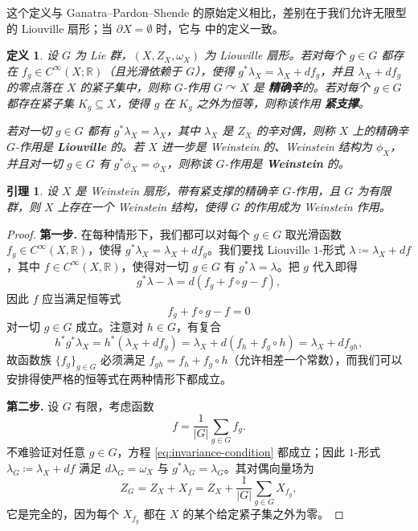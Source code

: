 \documentclass[11pt,a4paper]{article}
\renewcommand{\emph}[1]{{\bfseries #1}}
\theoremstyle{cnth}
\newtheorem{dfn}[thm]{定义}
\newtheorem{lmm}[thm]{引理}
\begin{document}
这个定义与 Ganatra--Pardon--Shende \cite{GPS20} 的原始定义相比，差别在于我们允许无限型的 Liouville 扇形；当 $\partial X=\emptyset$ 时，它与 \cite{CE12} 中的定义一致。

\begin{dfn}\label{defn:G-invariant-Weinstein-sector}
    设 $G$ 为 Lie 群，$(X,Z_X,\omega_X)$ 为 Liouville 扇形。若对每个 $g\in G$ 都存在 $f_g\in C^{\infty} (X;\mathbb{R})$（且光滑依赖于 $G$），使得 $g^{\ast}\lambda_X =\lambda_X +df_g$，并且 $\lambda_X +df_g$ 的零点落在 $X$ 的紧子集中，则称 $G$-作用 $G\curvearrowright X$ 是 \emph{精确辛}的。若对每个 $g\in G$ 都存在紧子集 $K_g\subseteq X$，使得 $g$ 在 $K_g$ 之外为恒等，则称该作用 \emph{紧支撑}。\par
    若对一切 $g\in G$ 都有 $g^{\ast}\lambda_X =\lambda_X$，其中 $\lambda_X$ 是 $Z_X$ 的辛对偶，则称 $X$ 上的精确辛 $G$-作用是 \emph{Liouville} 的。若 $X$ 进一步是 Weinstein 的、Weinstein 结构为 $\phi_X$，并且对一切 $g\in G$ 有 $g^{\ast}\phi_X =\phi_X$，则称该 $G$-作用是 \emph{Weinstein} 的。
\end{dfn}

\begin{lmm}
    设 $X$ 是 Weinstein 扇形，带有紧支撑的精确辛 $G$-作用，且 $G$ 为有限群，则 $X$ 上存在一个 Weinstein 结构，使得 $G$ 的作用成为 Weinstein 作用。
\end{lmm}

\begin{proof}
    \textbf{第一步.} 在每种情形下，我们都可以对每个 $g\in G$ 取光滑函数 $f_g\in C^{\infty} (X,\mathbb{R})$，使得 $g^{\ast}\lambda_X =\lambda_X +df_g$。我们要找 Liouville $1$-形式 $\lambda\coloneqq\lambda_X +df$，其中 $f\in C^{\infty}(X,\mathbb{R})$，使得对一切 $g\in G$ 有 $g^{\ast}\lambda =\lambda$。把 $g$ 代入即得
\[
        g^{\ast}\lambda -\lambda =d(f_g +f\circ g-f),
    \]
    因此 $f$ 应当满足恒等式
\begin{equation}\label{eq:invariance-condition}
        f_g +f\circ g-f=0
    \end{equation}
    对一切 $g\in G$ 成立。注意对 $h\in G$，有复合
\[
        h^{\ast}g^{\ast}\lambda_X =h^{\ast} (\lambda_X +df_g)=\lambda_X +d(f_h +f_g\circ h)=\lambda_X +df_{gh},
    \]
    故函数族 $\{f_g\}_{g\in G}$ 必须满足 $f_{gh}=f_h +f_g\circ h$（允许相差一个常数），而我们可以安排得使严格的恒等式在两种情形下都成立。\par
    \textbf{第二步.} 设 $G$ 有限，考虑函数
\[
        f=\frac{1}{\vert G\vert}\sum_{g\in G} f_g.
    \]
    不难验证对任意 $g\in G$，方程 \eqref{eq:invariance-condition} 都成立；因此 $1$-形式 $\lambda_G\coloneqq\lambda_X +df$ 满足 $d\lambda_G =\omega_X$ 与 $g^{\ast}\lambda_G =\lambda_G$。其对偶向量场为
\[
        Z_G =Z_X +X_f =Z_X+\frac{1}{\vert G\vert}\sum_{g\in G} X_{f_g},
    \]
    它是完全的，因为每个 $X_{f_g}$ 都在 $X$ 的某个给定紧子集之外为零。
\end{proof}
\end{document}
